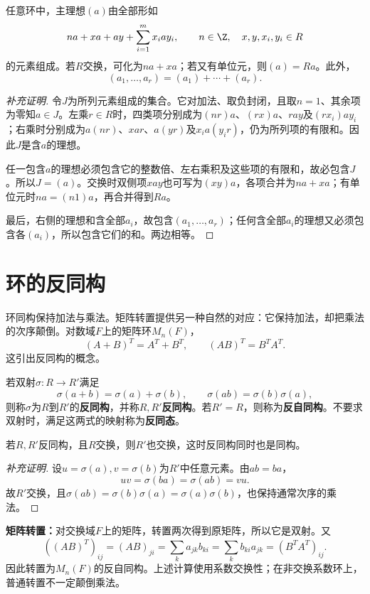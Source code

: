 \begin{proposition}
任意环中，主理想$(a)$由全部形如
\[
na+xa+ay+\sum_{i=1}^m x_iay_i,
\qquad n\in\Z,\quad x,y,x_i,y_i\in R
\]
的元素组成。若$R$交换，可化为$na+xa$；若又有单位元，则$(a)=Ra$。此外，
\[
(a_1,\ldots,a_r)=(a_1)+\cdots+(a_r).
\]
\end{proposition}
\begin{proof}[补充证明]
令$J$为所列元素组成的集合。它对加法、取负封闭，且取$n=1$、其余项为零知$a\in J$。左乘$r\in R$时，四类项分别成为$(nr)a$、$(rx)a$、$ray$及$(rx_i)ay_i$；右乘时分别成为$a(nr)$、$xar$、$a(yr)$及$x_i a(y_ir)$，仍为所列项的有限和。因此$J$是含$a$的理想。

任一包含$a$的理想必须包含它的整数倍、左右乘积及这些项的有限和，故必包含$J$。所以$J=(a)$。交换时双侧项$xay$也可写为$(xy)a$，各项合并为$na+xa$；有单位元时$na=(n1)a$，再合并得到$Ra$。

最后，右侧的理想和含全部$a_i$，故包含$(a_1,\ldots,a_r)$；任何含全部$a_i$的理想又必须包含各$(a_i)$，所以包含它们的和。两边相等。
\end{proof}


\section{环的反同构}

环同构保持加法与乘法。矩阵转置提供另一种自然的对应：它保持加法，却把乘法的次序颠倒。对数域$F$上的矩阵环$M_n(F)$，
\[
(A+B)^T=A^T+B^T,\qquad(AB)^T=B^TA^T.
\]
这引出反同构的概念。

\begin{definition}
若双射$\sigma:R\to R'$满足
\[
\sigma(a+b)=\sigma(a)+\sigma(b),\qquad
\sigma(ab)=\sigma(b)\sigma(a),
\]
则称$\sigma$为$R$到$R'$的\textbf{反同构}，并称$R,R'$\textbf{反同构}。若$R'=R$，则称为\textbf{反自同构}。不要求双射时，满足这两式的映射称为\textbf{反同态}。
\end{definition}

\begin{proposition}
若$R,R'$反同构，且$R$交换，则$R'$也交换，这时反同构同时也是同构。
\end{proposition}
\begin{proof}[补充证明]
设$u=\sigma(a),v=\sigma(b)$为$R'$中任意元素。由$ab=ba$，
\[
uv=\sigma(ba)=\sigma(ab)=vu.
\]
故$R'$交换，且$\sigma(ab)=\sigma(b)\sigma(a)=\sigma(a)\sigma(b)$，也保持通常次序的乘法。
\end{proof}

\begin{example}
\textbf{矩阵转置：}对交换域$F$上的矩阵，转置两次得到原矩阵，所以它是双射。又
\[
((AB)^T)_{ij}=(AB)_{ji}=\sum_k a_{jk}b_{ki}
=\sum_k b_{ki}a_{jk}=(B^TA^T)_{ij}.
\]
因此转置为$M_n(F)$的反自同构。上述计算使用系数交换性；在非交换系数环上，普通转置不一定颠倒乘法。
\end{example}

